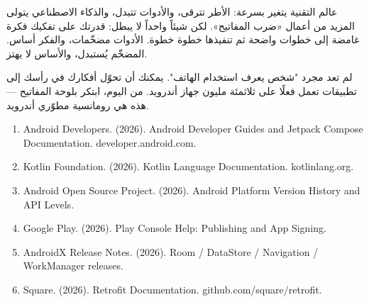 عالم التقنية يتغير بسرعة: الأطر تترقى، والأدوات تتبدل، والذكاء الاصطناعي يتولى المزيد من أعمال «ضرب المفاتيح». لكن شيئاً واحداً لا يبطل: قدرتك على تفكيك فكرة غامضة إلى خطوات واضحة ثم تنفيذها خطوة خطوة. الأدوات مضخّمات، والفكر أساس. المضخّم يُستبدل، والأساس لا يهتز.

لم تعد مجرد "شخص يعرف استخدام الهاتف". يمكنك أن تحوّل أفكارك في رأسك إلى تطبيقات تعمل فعلًا على ثلاثمئة مليون جهاز أندرويد. من اليوم، ابتكر بلوحة المفاتيح — هذه هي رومانسية مطوّري أندرويد.


\begin{enumerate}
  \item Android Developers. (2026). Android Developer Guides and Jetpack Compose Documentation. developer.android.com.
  \item Kotlin Foundation. (2026). Kotlin Language Documentation. kotlinlang.org.
  \item Android Open Source Project. (2026). Android Platform Version History and API Levels.
  \item Google Play. (2026). Play Console Help: Publishing and App Signing.
  \item AndroidX Release Notes. (2026). Room / DataStore / Navigation / WorkManager releases.
  \item Square. (2026). Retrofit Documentation. github.com/square/retrofit.
\end{enumerate}
